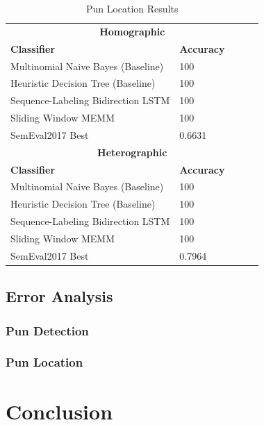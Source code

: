\documentclass{article}
\begin{document}
\begin{table}
\caption{Pun Location Results}\label{tab:pun_location_results}
\begin{center}
\begin{tabular}{l l l l l} 
\toprule
\multicolumn{5}{c}{\textbf{Homographic}}\\
\textbf{Classifier}					& \textbf{Accuracy}\\
Multinomial Naive Bayes (Baseline)	& 100\\
Heuristic Decision Tree (Baseline)	& 100\\
Sequence-Labeling Bidirection LSTM	& 100\\
Sliding Window MEMM					& 100\\
SemEval2017 Best					& 0.6631\\
\midrule
\multicolumn{5}{c}{\textbf{Heterographic}}\\
\textbf{Classifier}					& \textbf{Accuracy}\\
Multinomial Naive Bayes (Baseline)	& 100\\
Heuristic Decision Tree (Baseline)	& 100\\
Sequence-Labeling Bidirection LSTM	& 100\\
Sliding Window MEMM					& 100\\
SemEval2017 Best					& 0.7964\\
\bottomrule
\end{tabular}
\end{center}
\end{table}

\subsection{Error Analysis}

\subsubsection{Pun Detection}
\subsubsection{Pun Location}


\section{Conclusion}
\label{conclusion}
\end{document}
